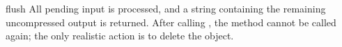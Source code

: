 \begin{methoddesc}[Decompress]{flush}{}
All pending input is processed, and a string containing the remaining
uncompressed output is returned.  After calling , the
 method cannot be called again; the only realistic
action is to delete the object.
\end{methoddesc}

\begin{seealso}
\end{seealso}


